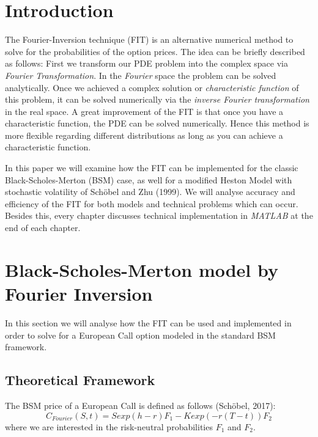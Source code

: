 \documentclass[a4paper,11pt]{article}
\begin{document}
\newpage                %

\listoffigures
\newpage


\tableofcontents

\newpage
{}      %
\setcounter{page}{1}        %
\section{Introduction}
The Fourier-Inversion technique (FIT) is an alternative numerical method to solve for the probabilities of the option prices. The idea can be briefly described as follows: First we transform our PDE problem into the complex space via \textit{Fourier Transformation}. In the \textit{Fourier} space the problem can be solved analytically. Once we achieved a complex solution or \textit{characteristic function} of this problem, it can be solved numerically via the \textit{inverse Fourier transformation} in the real space. A great improvement of the FIT is that once you have a characteristic function, the PDE can be solved numerically. Hence this method is more flexible regarding different distributions as long as you can achieve a characteristic function.

In this paper we will examine how the FIT can be implemented for the classic Black-Scholes-Merton (BSM) case, as well for a modified Heston Model with stochastic volatility of Sch\"obel and Zhu (1999). We will analyse accuracy and efficiency of the FIT for both models and technical problems which can occur. Besides this, every chapter discusses technical implementation in \textit{MATLAB} at the end of each chapter.
\section{Black-Scholes-Merton model by Fourier Inversion}
In this section we will analyse how the FIT can be used and implemented in order to solve for a European Call option modeled in the standard BSM framework. 
\subsection{Theoretical Framework}
The BSM price of a European Call is defined as follows (Sch\"obel, 2017):
\begin{equation}
C_{Fourier}(S,t)= Sexp(h-r)F_1 - Kexp(-r(T-t))F_2
\label{BSMF}
\end{equation}
where we are interested in the risk-neutral probabilities $F_1$ and $F_2$.
\end{document}
